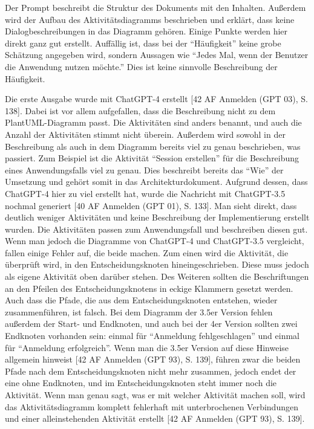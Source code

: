 Der Prompt beschreibt die Struktur des Dokuments mit den Inhalten. Außerdem wird der Aufbau des Aktivitätsdiagramms beschrieben und erklärt, 
dass keine Dialogbeschreibungen in das Diagramm gehören. Einige Punkte werden hier direkt ganz gut erstellt. Auffällig ist, dass bei der 
``Häufigkeit'' keine grobe Schätzung angegeben wird, sondern Aussagen wie ``Jedes Mal, wenn der Benutzer die Anwendung nutzen möchte.'' Dies ist 
keine sinnvolle Beschreibung der Häufigkeit.

Die erste Ausgabe wurde mit ChatGPT-4 erstellt [42 AF Anmelden (GPT 03), S. 138]. Dabei ist vor allem aufgefallen, dass die Beschreibung nicht 
zu dem PlantUML-Diagramm passt. Die Aktivitäten sind anders benannt, und auch die Anzahl der Aktivitäten stimmt nicht überein. Außerdem wird 
sowohl in der Beschreibung als auch in dem Diagramm bereits viel zu genau beschrieben, was passiert. Zum Beispiel ist die Aktivität 
``Session erstellen'' für die Beschreibung eines Anwendungsfalls viel zu genau. Dies beschreibt bereits das ``Wie'' der Umsetzung und gehört 
somit in das Architekturdokument. Aufgrund dessen, dass ChatGPT-4 hier zu viel erstellt hat, wurde die Nachricht mit ChatGPT-3.5 nochmal 
generiert [40 AF Anmelden (GPT 01), S. 133]. Man sieht direkt, dass deutlich weniger Aktivitäten und keine Beschreibung der Implementierung 
erstellt wurden. Die Aktivitäten passen zum Anwendungsfall und beschreiben diesen gut. Wenn man jedoch die Diagramme von ChatGPT-4 und ChatGPT-3.5 
vergleicht, fallen einige Fehler auf, die beide machen. Zum einen wird die Aktivität, die überprüft wird, in den Entscheidungsknoten 
hineingeschrieben. Diese muss jedoch als eigene Aktivität oben darüber stehen. Des Weiteren sollten die Beschriftungen an den Pfeilen des 
Entscheidungsknotens in eckige Klammern gesetzt werden. Auch dass die Pfade, die aus dem Entscheidungsknoten entstehen, wieder zusammenführen, ist falsch. 
Bei dem Diagramm der 3.5er Version fehlen außerdem der Start- und Endknoten, und auch bei der 4er Version sollten zwei Endknoten vorhanden sein: 
einmal für ``Anmeldung fehlgeschlagen'' und einmal für ``Anmeldung erfolgreich''. Wenn man die 3.5er Version auf diese Hinweise allgemein hinweist 
[42 AF Anmelden (GPT 93), S. 139], führen zwar die beiden Pfade nach dem Entscheidungsknoten nicht mehr zusammen, jedoch endet der eine ohne 
Endknoten, und im Entscheidungsknoten steht immer noch die Aktivität. Wenn man genau sagt, was er mit welcher Aktivität machen soll, wird das 
Aktivitätsdiagramm komplett fehlerhaft mit unterbrochenen Verbindungen und einer alleinstehenden Aktivität erstellt [42 AF Anmelden (GPT 93), S. 139]. 
